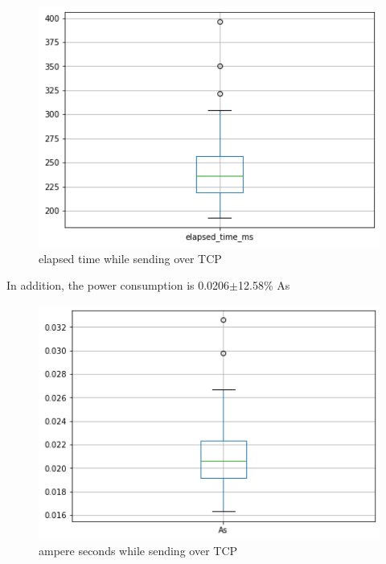 \begin{figure}[h!]
\centering
\includegraphics[width = 0.7 \linewidth]{fig/udp_tcp/tcp_boxplot_time.png}
\caption{elapsed time while sending over TCP}
\label{fig:tcp_boxplot_time}
\end{figure}
\linebreak
In addition, the power consumption is 0.0206$\pm$12.58\% As
\linebreak
\begin{figure}[h!]
\centering
\includegraphics[width = 0.7 \linewidth]{fig/udp_tcp/tcp_boxplot_As.png}
\caption{ampere seconds while sending over TCP}
\label{fig:tcp_boxplot_As}
\end{figure}
\pagebreak
